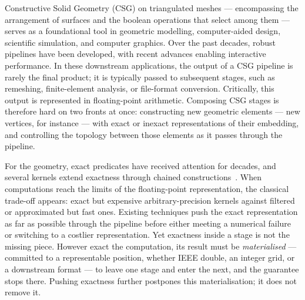 \documentclass{egpubl}
\begin{document}
Constructive Solid Geometry (CSG) on triangulated meshes --- encompassing the arrangement of surfaces and the boolean operations that select among them --- serves as a foundational tool in geometric modelling, computer-aided design, scientific simulation, and computer graphics. Over the past decades, robust pipelines have been developed, with recent advances enabling interactive performance. In these downstream applications, the output of a CSG pipeline is rarely the final product; it is typically passed to subsequent stages, such as remeshing, finite-element analysis, or file-format conversion. Critically, this output is represented in floating-point arithmetic. Composing CSG stages is therefore hard on two fronts at once: constructing new geometric elements --- new vertices, for instance --- with exact or inexact representations of their embedding, and controlling the topology between those elements as it passes through the pipeline.

For the geometry, exact predicates have received attention for decades, and several kernels extend exactness through chained constructions~\cite{Shewchuk1997,Attene2020,Trettner2022,Levy2025}. When computations reach the limits of the floating-point representation, the classical trade-off appears: exact but expensive arbitrary-precision kernels against filtered or approximated but fast ones. Existing techniques push the exact representation as far as possible through the pipeline before either meeting a numerical failure or switching to a costlier representation. Yet exactness inside a stage is not the missing piece. However exact the computation, its result must be \emph{materialised} --- committed to a representable position, whether IEEE double, an integer grid, or a downstream format --- to leave one stage and enter the next, and the guarantee stops there. Pushing exactness further postpones this materialisation; it does not remove it.
\end{document}
